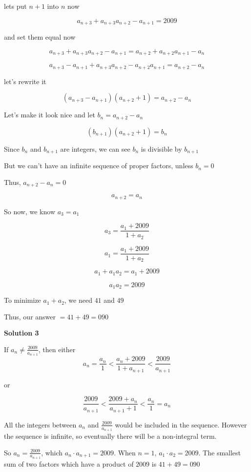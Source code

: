 \begin{enumerate}
 
lets put $n+1$ into $n$ now

 

 \[a_{n + 3}+a_{n + 3} a_{n + 2}-a_{n+1}= 2009\]

 
and set them equal now

 

 \[a_{n + 3}+a_{n + 3} a_{n + 2}-a_{n+1}= a_{n + 2}+a_{n + 2} a_{n + 1}-a_n\]

 \[a_{n + 3}-a_{n+1}+a_{n + 3} a_{n + 2}-a_{n + 2} a_{n + 1}= a_{n + 2}-a_n\]

 
let's rewrite it

 

 \[(a_{n + 3}-a_{n+1})(a_{n + 2}+1)= a_{n + 2}-a_n\]

 
Let's make it look nice and let $b_n=a_{n + 2}-a_n$

 \[(b_{n+1})(a_{n + 2}+1)= b_n\]

 
Since $b_n$ and $b_{n+1}$ are integers, we can see $b_n$ is divisible by $b_{n+1}$

 
But we can't have an infinite sequence of proper factors, unless $b_n=0$

 
Thus, $a_{n + 2}-a_n=0$

 \[a_{n + 2}=a_n\]

 
So now, we know $a_3=a_1$

 \[a_{3} = \frac {a_1 + 2009} {1 + a_{2}}\]

 \[a_{1} = \frac {a_1 + 2009} {1 + a_{2}}\]

 \[a_{1}+a_{1}a_{2} = a_1 + 2009\]

 \[a_{1}a_{2} = 2009\]

 
To minimize $a_{1}+a_{2}$, we need $41$ and $49$

 
Thus, our answer $= 41+49=\boxed {090}$




\textbf{Solution 3}

If $a_{n} \ne \frac {2009}{a_{n+1}}$, then either
 \[a_{n} = \frac {a_{n}}{1} < \frac {a_{n} + 2009}{1 + a_{n+1}} < \frac {2009}{a_{n+1}}\]

 or

 
 \[\frac {2009}{a_{n+1}} < \frac {2009 + a_{n}}{a_{n+1} + 1} < \frac {a_{n}}{1} = a_{n}\]

 All the integers between $a_{n}$ and $\frac {2009}{a_{n+1}}$ would be included in the sequence. However the sequence is infinite, so eventually there will be a non-integral term.

 So $a_{n} = \frac {2009}{a_{n+1}}$, which $a_{n} \cdot a_{n+1} = 2009$. When $n = 1$, $a_{1} \cdot a_{2} = 2009$. The smallest sum of two factors which have a product of $2009$ is $41 + 49=\boxed {090}$





\end{enumerate}
